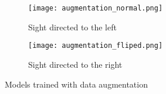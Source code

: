\begin{figure}[H]
\centering
\begin{subfigure}{.5\textwidth}
  \centering
  \texttt{[image: augmentation\_normal.png]}
  \caption{Sight directed to the left}
  \label{subfig:augmentation_normal}
\end{subfigure}%
\begin{subfigure}{.5\textwidth}
  \centering
  \texttt{[image: augmentation\_fliped.png]}
  \caption{Sight directed to the right}
  \label{subfig:augmentation_fliped}
\end{subfigure}
\caption{Models trained with data augmentation}
\label{fig:augmented_data}
\end{figure}
